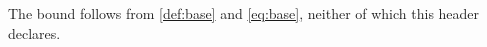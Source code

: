 
\begin{remark}\label{rem:sloppy}
The bound follows from \cref{def:base} and \eqref{eq:base}, neither of which
this header declares.
\end{remark}
